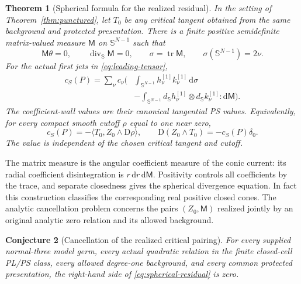 \documentclass[11pt,a4paper]{article}
\newcommand{\MathEqref}[1]{{\hypersetup{linkcolor=EquationLink}\eqref{#1}}}
\newcommand{\Thmref}[1]{Theorem~\ref{#1}}
\newtheorem{theorem}{Theorem}[section]
\newtheorem{conjecture}[theorem]{Conjecture}
\theoremstyle{definition}
\theoremstyle{remark}
\numberwithin{equation}{section}
\newcommand{\D}{\mathrm D}
\newcommand{\dd}{\mathrm d}
\newcommand{\tr}{\operatorname{tr}}
\begin{document}
\begin{theorem}[Spherical formula for the realized residual]
\label{thm:spherical}
In the setting of \Thmref{thm:punctured}, let $T_0$ be any critical
tangent obtained from the same background and protected presentation.
There is a finite positive semidefinite matrix-valued measure
$\mathsf M$ on $\mathbb S^{N-1}$ such that
\begin{equation}
 \mathsf M\theta=0,\qquad
 \operatorname{div}_{\mathbb S}\mathsf M=0,\qquad
 \sigma=\tr\mathsf M,\qquad
 \sigma(\mathbb S^{N-1})=2\nu.
                         \label{eq:angular-constraints}
\end{equation}
For the actual first jets in \MathEqref{eq:leading-tensor},
\begin{equation}
 \begin{split}
 c_S(P)=\sum_\nu c_\nu\biggl(&
      \int_{\mathbb S^{N-1}}h_\nu^{[1]}k_\nu^{[1]}\,\dd\sigma\\
      &-\int_{\mathbb S^{N-1}}
          d_{\mathbb S}h_\nu^{[1]}\otimes
          d_{\mathbb S}k_\nu^{[1]}:\dd\mathsf M\biggr).
 \end{split}
                         \label{eq:spherical-residual}
\end{equation}
The coefficient-wall values are their canonical tangential PS values.
Equivalently, for every compact smooth cutoff $\rho$ equal to one near
zero,
\begin{equation}
 c_S(P)=-\langle T_0,Z_0\wedge\D\rho\rangle,
 \qquad \D(Z_0\wedge T_0)=-c_S(P)\delta_0.
                         \label{eq:tangent-residual}
\end{equation}
The value is independent of the chosen critical tangent and cutoff.
\end{theorem}

The matrix measure is the angular coefficient measure of the conic
current: its radial coefficient disintegration is $r\,\dd r\,\dd\mathsf
M$.  Positivity controls all coefficients by the trace, and separate
closedness gives the spherical divergence equation.  In fact this
construction classifies the corresponding real positive closed cones.
The analytic cancellation problem concerns the pairs $(Z_0,\mathsf M)$
realized jointly by an original analytic zero relation and its allowed
background.

\begin{conjecture}[Cancellation of the realized critical pairing]
\label{conj:critical}
For every supplied normal-three model germ, every actual quadratic
relation in the finite closed-cell PL/PS class, every allowed
degree-one background, and every common protected presentation, the
right-hand side of \MathEqref{eq:spherical-residual} is zero.
\end{conjecture}
\end{document}
